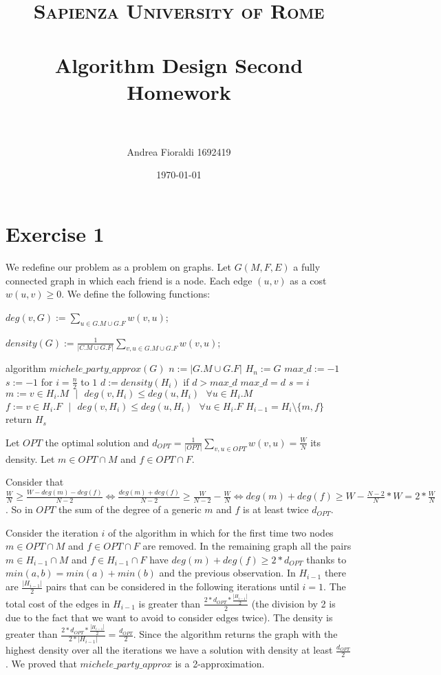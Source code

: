 \documentclass[paper=a4, fontsize=11pt]{scrartcl} %
\title{    
\normalfont \normalsize 
\textsc{Sapienza University of Rome} \\ [25pt] %
\horrule{0.5pt} \\[0.4cm] %
\huge Algorithm Design Second Homework \\ %
\horrule{2pt} \\[0.5cm] %
}
\author{Andrea Fioraldi 1692419} %
\date{\normalsize\today} %
\numberwithin{equation}{section} %
\numberwithin{figure}{section} %
\numberwithin{table}{section} %
\begin{document}
\maketitle %

\section{Exercise 1}

We redefine our problem as a problem on graphs. Let $G(M, F, E)$ a fully connected graph in which each friend is a node. Each edge $(u,v)$ as a cost $w(u,v) \geq 0$.
We define the following functions:

$deg(v, G) := \sum_{u \in G.M \cup G.F} w(v, u)$;

$density(G) := \frac{1}{|C.M \cup G.F|}\sum_{v, u \in G.M \cup G.F} w(v, u)$;

\begin{pseudo}
algorithm $michele\_party\_approx(G)$
    $n := |G.M \cup G.F|$
    $H_n := G$
    $max\_d := -1$
    $s := -1$
    for $i = \frac{n}{2}$ to $1$
        $d := density(H_i)$
        if $d > max\_d$
            $max\_d = d$
            $s = i$
        $m := v \in H_i.M\text{ }|\text{ }deg(v, H_i) \leq deg(u, H_i)\text{ }\forall u \in H_i.M$
        $f := v \in H_i.F\text{ }|\text{ }deg(v, H_i) \leq deg(u, H_i)\text{ }\forall u \in H_i.F$
        $H_{i-1} = H_i \setminus \{m, f\}$
    return $H_s$
\end{pseudo}

Let $OPT$ the optimal solution and $d_{OPT} = \frac{1}{|OPT|}\sum_{v, u \in OPT} w(v, u) = \frac{W}{N}$ its density. Let $m \in OPT \cap M$ and $f \in OPT \cap F$.

Consider that $\frac{W}{N} \geq \frac{W-deg(m)-deg(f)}{N-2} \Leftrightarrow \frac{deg(m)+deg(f)}{N-2} \geq \frac{W}{N-2} - \frac{W}{N} \Leftrightarrow deg(m)+deg(f) \geq W - \frac{N-2}{N}*W = 2*\frac{W}{N}$.
So in $OPT$ the sum of the degree of a generic $m$ and $f$ is at least twice $d_{OPT}$.

\bigskip
Consider the iteration $i$ of the algorithm in which for the first time two nodes $m \in OPT \cap M$ and $f \in OPT \cap F$ are removed. 
In the remaining graph all the pairs $m \in H_{i-1} \cap M$ and $f \in H_{i-1} \cap F$ have $deg(m)+deg(f) \geq 2*d_{OPT}$ thanks to $min(a,b) = min(a)+min(b)$ and the previous observation.
In $H_{i-1}$ there are $\frac{|H_{i-1}|}{2}$ pairs that can be considered in the following iterations until $i = 1$. The total cost of the edges in $H_{i-1}$ is greater than $\frac{2*d_{OPT}*\frac{|H_{i-1}|}{2}}{2}$ (the division by 2 is due to the fact that we want to avoid to consider edges twice). The density is greater than $\frac{2*d_{OPT}*\frac{|H_{i-1}|}{2}}{2*|H_{i-1}|} = \frac{d_{OPT}}{2}$.
Since the algorithm returns the graph with the highest density over all the iterations we have a solution with density at least $\frac{d_{OPT}}{2}$.
We proved that $michele\_party\_approx$ is a 2-approximation.
\end{document}
